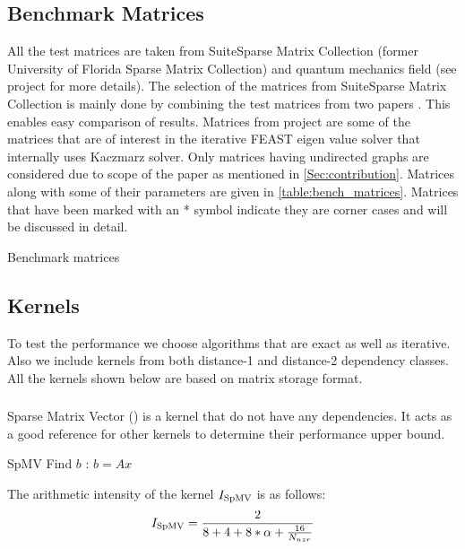 \subsection{Benchmark Matrices}
All the test matrices are taken from SuiteSparse Matrix Collection (former University of Florida Sparse Matrix Collection) \cite{UOF} and quantum mechanics field (see \ESSEX project \cite{ESSEX} for more details). The selection of the matrices from SuiteSparse Matrix Collection is  mainly done by combining the test matrices from two papers \cite{RSB,park_ls}. This enables easy comparison of results. Matrices from \ESSEX project are some of the matrices that are of interest in the iterative FEAST eigen value solver that internally uses Kaczmarz solver.  Only matrices having undirected graphs are considered due to scope of the paper as mentioned in \cref{Sec:contribution}. Matrices along with some of their parameters are given in \cref{table:bench_matrices}.  Matrices that have been marked with an * symbol indicate they are corner cases and will be discussed in detail.

\begin{table}[ht]
	\footnotesize
	\caption{Benchmark matrices}\label{tab:test_mtx}
	\label{table:bench_matrices}
	\begin{center}
		
	\end{center}

\end{table}

\subsection{Kernels} \label{subsec:test_kernels}
To test the performance we choose algorithms that are exact as well as iterative. Also we include kernels from both distance-1 and distance-2 dependency classes. All the kernels shown below are based on \CRS matrix storage format.

\subsubsection{\SpMV}
Sparse Matrix Vector (\SpMV) is a kernel that do not have any dependencies. It  acts as a good reference for other kernels to determine their performance upper bound.
\begin{algorithm}[H]
	\caption{SpMV Find $b$ : $b=A x$} 
	\label{alg:SpMV}
	\begin{algorithmic}[1]
		\ENDFOR
		\ENDFOR
	\end{algorithmic}
\end{algorithm}
The arithmetic intensity of the \SpMV kernel $I_\mathrm{SpMV}$ is as follows:
\begin{equation}
\label{eq:SpMV_intensity}
I_\mathrm{\SpMV} = \frac{2}{8+4+8*\alpha+\frac{16}{\NNZRmath}} \\
\end{equation}

